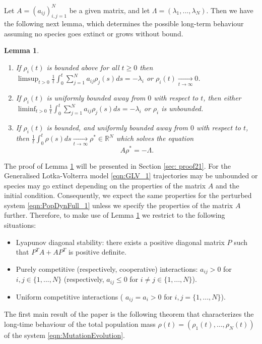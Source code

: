 \documentclass{article}
\newtheorem{lemma}{Lemma}[section]
\begin{document}
Let $A=(a_{ij})_{i,j=1}^N$ be a given matrix, and let ${\Lambda}=(\lambda_1,...,\lambda_N)$. Then we have 
the following next lemma, which determines the possible long-term behaviour assuming no species goes extinct or grows without bound.
\begin{lemma}\label{lma:MassBoundSolution}
\hspace{0.1em}
\begin{enumerate}
    \item If $\rho_i(t)$ is bounded above for all $t\geq{0}$ then $\limsup_{t>0}\frac{1}{t}\int_{0}^t\sum_{j=1}^Na_{ij}\rho_j(s)ds=-\lambda_i$ or $\rho_i(t)\xrightarrow[t\rightarrow\infty]{}0$.
    \item If $\rho_i(t)$ is uniformly bounded away from $0$ with respect to $t$, then either $\liminf_{t>0}\frac{1}{t}\int_{0}^t\sum_{j=1}^Na_{ij}\rho_j(s)ds=-\lambda_i$ or $\rho_i$ is unbounded.
    
    \item If $\rho_i(t)$ is bounded, and uniformly bounded away from $0$ with respect to $t$, then $\frac{1}{t}\int_{0}^ t\rho(s)ds\xrightarrow[t\rightarrow\infty]{}\rho^{*}\in\mathbb{R}^N$ which solves the equation \[{A}\rho^{*}=-{\Lambda}.\]
\end{enumerate}
\end{lemma}
The proof of Lemma \ref{lma:MassBoundSolution} will be presented in Section \ref{sec: proof21}. For the Generalised Lotka-Volterra model \eqref{eqn:GLV_1} trajectories may be unbounded or species may go extinct depending on the properties of the matrix $A$ and the initial condition. Consequently, we expect the same properties for the perturbed system \eqref{eqn:PopDynFull_1} unless we specify the properties of the matrix $A$ further. Therefore, to make use of Lemma \ref{lma:MassBoundSolution} we restrict to the following situations:
\begin{itemize}
    \item[a)] Lyapunov diagonal stability: there exists a positive diagonal matrix $P$ such that $P^TA+AP^T$ is positive definite. 
    \item[b)] Purely competitive (respectively, cooperative) interactions: $a_{ij}>0$ for $i,j\in\{1,...,N\}$  (respectively, $a_{ij}\leq{0}$ for $i\neq{}j\in\{1,...,N\}$).
    \item[c)] Uniform competitive interactions ( $a_{ij}=a_{i}>0$ for $i,j=\{1,...,N\}$).
\end{itemize}
The first main result of the paper is the following theorem that characterizes the long-time behaviour of the total population mass $\rho(t)=(\rho_1(t),\ldots, \rho_N(t))$ of the system \eqref{eqn:MutationEvolution}.
\end{document}
